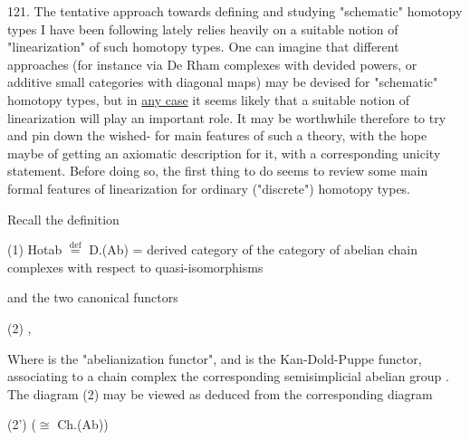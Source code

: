 
121.    The tentative approach towards defining and studying "schematic"
homotopy types I have been following lately relies heavily on a suitable
notion of "linearization" of such homotopy types.  One  can imagine
that  different approaches (for instance via De Rham complexes
with devided powers,  or additive small categories with diagonal maps)
\margin{$\times$}may be devised for "schematic" homotopy types,  but in \uline{any case} it seems
likely that a suitable notion of linearization will play an important
role\xout{,}.  It may be worthwhile therefore to try and pin down the wished-%
for main features of such a theory,  with the hope maybe of getting an
axiomatic description for it,  with a corresponding unicity statement.
Before doing so,  the first thing to do seems to review some main formal
features of linearization for ordinary ("discrete") homotopy types.

Recall the definition

(1) \qquad Hotab $\overset{\mathrm{def}}{=}$ D.(Ab) = derived category of the category of
 abelian chain complexes\hand{,} with
respect to quasi-isomorphisms\hand{,}

and the two canonical functors

(2) \qquad {} \quad ,

Where  is the "abelianization functor",  and  is the Kan-Dold-Puppe
functor,  associating to a chain complex the  corresponding
semisimplicial abelian group .  The diagram (2) may be viewed as deduced
from the corresponding diagram

(2') \qquad {} \quad ($\cong$ Ch.(Ab))

